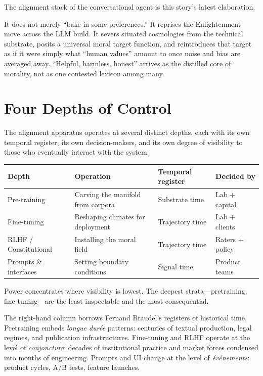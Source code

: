 The alignment stack of the conversational agent is this story's latest elaboration.

It does not merely ``bake in some preferences.'' It reprises the Enlightenment move across the LLM build. It severs situated cosmologies from the technical substrate, posits a universal moral target function, and reintroduces that target as if it were simply what ``human values'' amount to once noise and bias are averaged away. ``Helpful, harmless, honest'' arrives as the distilled core of morality, not as one contested lexicon among many.

\section{Four Depths of Control}

The alignment apparatus operates at several distinct depths, each with its own temporal register, its own decision-makers, and its own degree of visibility to those who eventually interact with the system.

\begin{formalbox}[title={Four Depths of Control}]
\begin{tabular}{p{2.5cm} p{3.5cm} p{3cm} p{2.5cm}}
\textbf{Depth} & \textbf{Operation} & \textbf{Temporal register} & \textbf{Decided by} \\
\hline
Pre-training & Carving the manifold from corpora & Substrate time & Lab + capital \\
Fine-tuning & Reshaping climates for deployment & Trajectory time & Lab + clients \\
RLHF / Constitutional & Installing the moral field & Trajectory time & Raters + policy \\
Prompts \& interfaces & Setting boundary conditions & Signal time & Product teams \\
\end{tabular}

Power concentrates where visibility is lowest. The deepest strata---pretraining, fine-tuning---are the least inspectable and the most consequential.
\end{formalbox}

The right-hand column borrows Fernand Braudel's registers of historical time. Pretraining embeds \emph{longue dur\'ee} patterns: centuries of textual production, legal regimes, and publication infrastructures. Fine-tuning and RLHF operate at the level of \emph{conjoncture}: decades of institutional practice and market forces condensed into months of engineering. Prompts and UI change at the level of \emph{\'ev\'enements}: product cycles, A/B tests, feature launches.

